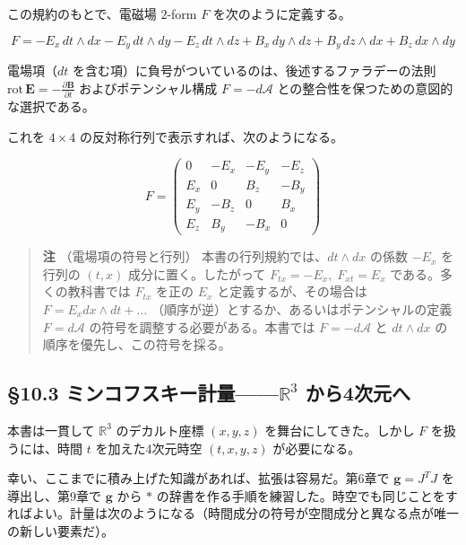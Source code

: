 \documentclass[a4paper,12pt,openany]{book}
\begin{document}
この規約のもとで、電磁場 \(2\)-form \(F\) を次のように定義する。

\[
F = -E_x\,dt\wedge dx - E_y\,dt\wedge dy - E_z\,dt\wedge dz + B_x\,dy\wedge dz + B_y\,dz\wedge dx + B_z\,dx\wedge dy
\]

電場項（\(dt\)
を含む項）に負号がついているのは、後述するファラデーの法則
\(\mathrm{rot}\,\mathbf{E} = -\frac{\partial\mathbf{B}}{\partial t}\)
およびポテンシャル構成 \(F = -d\mathcal{A}\)
との整合性を保つための意図的な選択である。

これを \(4\times4\) の反対称行列で表示すれば、次のようになる。

\[F = \begin{pmatrix}
0 & -E_x & -E_y & -E_z \\
E_x & 0 & B_z & -B_y \\
E_y & -B_z & 0 & B_x \\
E_z & B_y & -B_x & 0
\end{pmatrix}\]

\begin{quote}
\textbf{注} （電場項の符号と行列） 本書の行列規約では、\(dt \wedge dx\)
の係数 \(-E_x\) を行列の \((t,x)\) 成分に置く。したがって
\(F_{tx}=-E_x,\;F_{xt}=E_x\) である。多くの教科書では \(F_{t x}\) を正の
\(E_x\) と定義するが、その場合は \(F = E_x dx \wedge dt + \dots\)
（順序が逆）とするか、あるいはポテンシャルの定義 \(F=d\mathcal{A}\)
の符号を調整する必要がある。本書では \(F=-d\mathcal{A}\) と
\(dt \wedge dx\) の順序を優先し、この符号を採る。
\end{quote}

\par\vspace{0.35em}\par

\hypertarget{ux30dfux30f3ux30b3ux30d5ux30b9ux30adux30fcux8a08ux91cfmathbbr3-ux304bux30894ux6b21ux5143ux3078}{%
\subsection{\texorpdfstring{§10.3
ミンコフスキー計量——\(\mathbb{R}^3\)
から4次元へ}{§10.3 ミンコフスキー計量——\textbackslash mathbb\{R\}\^{}3 から4次元へ}}\label{ux30dfux30f3ux30b3ux30d5ux30b9ux30adux30fcux8a08ux91cfmathbbr3-ux304bux30894ux6b21ux5143ux3078}}

本書は一貫して \(\mathbb{R}^3\) のデカルト座標 \((x,y,z)\)
を舞台にしてきた。しかし \(F\) を扱うには、時間 \(t\) を加えた4次元時空
\((t,x,y,z)\) が必要になる。

幸い、ここまでに積み上げた知識があれば、拡張は容易だ。第6章で
\(\mathbf{g} = J^T J\) を導出し、第9章で \(\mathbf{g}\) から \(\ast\)
の辞書を作る手順を練習した。時空でも同じことをすればよい。計量は次のようになる（時間成分の符号が空間成分と異なる点が唯一の新しい要素だ）。
\end{document}
